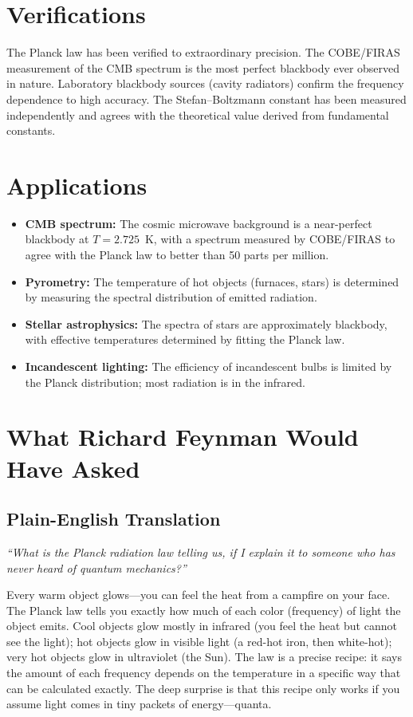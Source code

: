 \documentclass[11pt,openright]{book}
\begin{document}
\section*{Verifications}

The Planck law has been verified to extraordinary precision. The COBE/FIRAS measurement of the CMB spectrum is the most perfect blackbody ever observed in nature. Laboratory blackbody sources (cavity radiators) confirm the frequency dependence to high accuracy. The Stefan--Boltzmann constant has been measured independently and agrees with the theoretical value derived from fundamental constants.
\section*{Applications}

\begin{itemize}
  \item \textbf{CMB spectrum:} The cosmic microwave background is a near-perfect blackbody at $T = 2.725$~K, with a spectrum measured by COBE/FIRAS to agree with the Planck law to better than 50 parts per million.
  \item \textbf{Pyrometry:} The temperature of hot objects (furnaces, stars) is determined by measuring the spectral distribution of emitted radiation.
  \item \textbf{Stellar astrophysics:} The spectra of stars are approximately blackbody, with effective temperatures determined by fitting the Planck law.
  \item \textbf{Incandescent lighting:} The efficiency of incandescent bulbs is limited by the Planck distribution; most radiation is in the infrared.
\end{itemize}
\section*{What Richard Feynman Would Have Asked}

\subsection*{Plain-English Translation}
\textit{``What is the Planck radiation law telling us, if I explain it to someone who has never heard of quantum mechanics?''}

Every warm object glows---you can feel the heat from a campfire on your face. The Planck law tells you exactly how much of each color (frequency) of light the object emits. Cool objects glow mostly in infrared (you feel the heat but cannot see the light); hot objects glow in visible light (a red-hot iron, then white-hot); very hot objects glow in ultraviolet (the Sun). The law is a precise recipe: it says the amount of each frequency depends on the temperature in a specific way that can be calculated exactly. The deep surprise is that this recipe only works if you assume light comes in tiny packets of energy---quanta.
\end{document}
